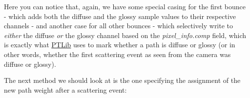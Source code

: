  \begin{DoxyParagraph}{}
Here you can notice that, again, we have some special casing for the first bounce -\/ which adds both the diffuse and the glossy sample values to their respective channels -\/ and another case for all other bounces -\/ which selectively write to {\itshape either} the diffuse {\itshape or} the glossy channel based on the {\itshape pixel\+\_\+info.\+comp} field, which is exactly what \hyperlink{group___p_t_lib}{P\+T\+Lib} uses to mark whether a path is diffuse or glossy (or in other words, whether the first scattering event as seen from the camera was diffuse or glossy).
\end{DoxyParagraph}
\begin{DoxyParagraph}{}
The next method we should look at is the one specifying the assignment of the new path weight after a scattering event\+:
\end{DoxyParagraph}

